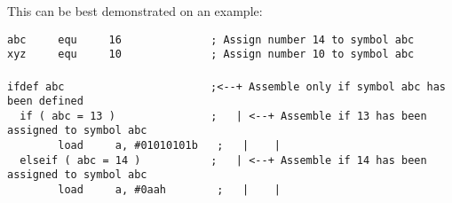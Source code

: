         This can be best demonstrated on an example:
                \begin{code}[h!]
                        \mysmallfont{}
                        {\color{highlight_constant}\verb'abc'}\verb'     '{\color{highlight_directive}\verb'equ'}\verb'     '{\color{highlight_unknown_base}\verb'16'}\verb'              '{\color{highlight_comment}\verb'; Assign number 14 to symbol abc'}\\
                        {\color{highlight_constant}\verb'xyz'}\verb'     '{\color{highlight_directive}\verb'equ'}\verb'     '{\color{highlight_unknown_base}\verb'10'}\verb'              '{\color{highlight_comment}\verb'; Assign number 10 to symbol abc'}\\
                        \verb''\\
                        {\color{highlight_directive}\verb'ifdef'}\verb' '{\color{highlight_constant}\verb'abc'}\verb'                       '{\color{highlight_comment}\verb';<--+ Assemble only if symbol abc has been defined'}\\
                        \verb'  '{\color{highlight_directive}\verb'if'}\verb' '{\color{highlight_symbol}\verb'('}\verb' '{\color{highlight_constant}\verb'abc'}\verb' '{\color{highlight_symbol}\verb'='}\verb' '{\color{highlight_unknown_base}\verb'13'}\verb' '{\color{highlight_symbol}\verb')'}\verb'               '{\color{highlight_comment}\verb';   | <--+ Assemble if 13 has been assigned to symbol abc'}\\
                        \verb'        '{\color{highlight_instruction}\verb'load'}\verb'     '{\color{highlight_sfr}\verb'a'}{\color{highlight_oper_sep}\verb','}\verb' '{\color{highlight_imm_bin}\verb'#01010101b'}\verb'   '{\color{highlight_comment}\verb';   |    |'}\\
                        \verb'  '{\color{highlight_directive}\verb'elseif'}\verb' '{\color{highlight_symbol}\verb'('}\verb' '{\color{highlight_constant}\verb'abc'}\verb' '{\color{highlight_symbol}\verb'='}\verb' '{\color{highlight_unknown_base}\verb'14'}\verb' '{\color{highlight_symbol}\verb')'}\verb'           '{\color{highlight_comment}\verb';   | <--+ Assemble if 14 has been assigned to symbol abc'}\\
                        \verb'        '{\color{highlight_instruction}\verb'load'}\verb'     '{\color{highlight_sfr}\verb'a'}{\color{highlight_oper_sep}\verb','}\verb' '{\color{highlight_imm_hex}\verb'#0aah'}\verb'        '{\color{highlight_comment}\verb';   |    |'}\\

\end{code}
